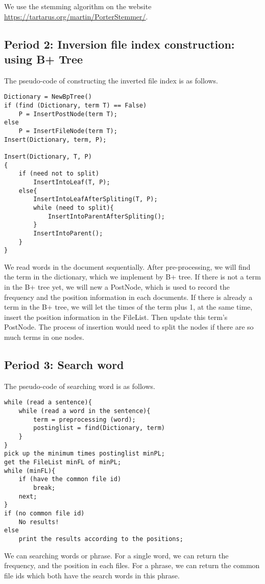 \documentclass[12pt]{article}
\begin{document}
We use the stemming algorithm on the website \url{https://tartarus.org/martin/PorterStemmer/}.
	
\subsection{Period 2: Inversion file index construction: using B+ Tree}

The pseudo-code of constructing the inverted file index is as follows.
\begin{lstlisting}
Dictionary = NewBpTree()
if (find (Dictionary, term T) == False)
	P = InsertPostNode(term T);
else
	P = InsertFileNode(term T);
Insert(Dictionary, term, P);

Insert(Dictionary, T, P)
{
	if (need not to split)
		InsertIntoLeaf(T, P);
	else{
		InsertIntoLeafAfterSpliting(T, P);
		while (need to split){
			InsertIntoParentAfterSpliting();
		}
		InsertIntoParent();
	}
}
\end{lstlisting}

We read words in the document sequentially. After pre-processing, we will find the term in the dictionary, which we implement by B+ tree. If there is not a term in the B+ tree yet, we will new a PostNode, which is used to record the frequency and the position information in each documents. If there is already a term in the B+ tree, we will let the times of the term plus 1, at the same time, insert the position information in the FileList. Then update this term's PostNode. The process of insertion would need to split the nodes if there are so much terms in one nodes.

\subsection{Period 3: Search word}
The pseudo-code of searching word is as follows.
\begin{lstlisting}
while (read a sentence){
	while (read a word in the sentence){
		term = preprocessing (word);
		postinglist = find(Dictionary, term)
	}
}
pick up the minimum times postinglist minPL;
get the FileList minFL of minPL;
while (minFL){
	if (have the common file id)
		break;
	next;	
}
if (no common file id)
	No results!
else
	print the results according to the positions;
\end{lstlisting}
We can searching words or phrase. For a single word, we can return the frequency, and the position in each files. For a phrase, we can return the common file ids which both have the search words in this phrase.
\end{document}
